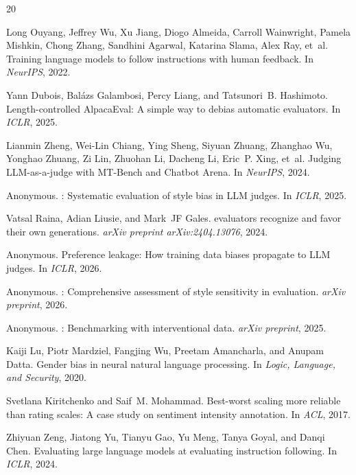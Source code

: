 \documentclass[11pt,a4paper]{article}
\begin{document}
\begin{thebibliography}{20}

Long Ouyang, Jeffrey Wu, Xu Jiang, Diogo Almeida, Carroll Wainwright, Pamela Mishkin, Chong Zhang, Sandhini Agarwal, Katarina Slama, Alex Ray, et~al.
\newblock Training language models to follow instructions with human feedback.
\newblock In \emph{NeurIPS}, 2022.

Yann Dubois, Bal\'{a}zs Galambosi, Percy Liang, and Tatsunori~B. Hashimoto.
\newblock Length-controlled {A}lpaca{E}val: A simple way to debias automatic evaluators.
\newblock In \emph{ICLR}, 2025.

Lianmin Zheng, Wei-Lin Chiang, Ying Sheng, Siyuan Zhuang, Zhanghao Wu, Yonghao Zhuang, Zi Lin, Zhuohan Li, Dacheng Li, Eric~P. Xing, et~al.
\newblock Judging {LLM}-as-a-judge with {MT-Bench} and {Chatbot Arena}.
\newblock In \emph{NeurIPS}, 2024.

Anonymous.
: Systematic evaluation of style bias in {LLM} judges.
\newblock In \emph{ICLR}, 2025.

Vatsal Raina, Adian Liusie, and Mark~JF Gales.
 evaluators recognize and favor their own generations.
\newblock \emph{arXiv preprint arXiv:2404.13076}, 2024.

Anonymous.
\newblock Preference leakage: How training data biases propagate to {LLM} judges.
\newblock In \emph{ICLR}, 2026.

Anonymous.
: Comprehensive assessment of style sensitivity in evaluation.
\newblock \emph{arXiv preprint}, 2026.

Anonymous.
: Benchmarking with interventional data.
\newblock \emph{arXiv preprint}, 2025.

Kaiji Lu, Piotr Mardziel, Fangjing Wu, Preetam Amancharla, and Anupam Datta.
\newblock Gender bias in neural natural language processing.
\newblock In \emph{Logic, Language, and Security}, 2020.

Svetlana Kiritchenko and Saif~M. Mohammad.
\newblock Best-worst scaling more reliable than rating scales: A case study on sentiment intensity annotation.
\newblock In \emph{ACL}, 2017.

Zhiyuan Zeng, Jiatong Yu, Tianyu Gao, Yu Meng, Tanya Goyal, and Danqi Chen.
\newblock Evaluating large language models at evaluating instruction following.
\newblock In \emph{ICLR}, 2024.

\end{thebibliography}
\end{document}
